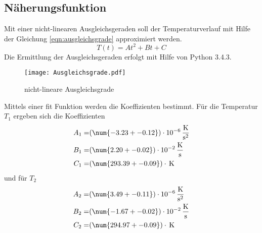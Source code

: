\subsection{Näherungsfunktion}
Mit einer nicht-linearen Ausgleichsgeraden soll der Temperaturverlauf mit Hilfe der Gleichung \ref{eqn:ausgleichsgrade} approximiert werden.
\begin{equation}
  T(t) = At^2 + Bt +C
  \label{eqn:ausgleichsgrade}
\end{equation}
Die Ermittlung der Ausgleichsgeraden erfolgt mit Hilfe von Python 3.4.3.
\begin{figure}
  \centering
  \texttt{[image: Ausgleichsgrade.pdf]}
  \caption{nicht-lineare Ausgleichsgrade}
  \label{fig:ausg}
\end{figure}
Mittels einer fit Funktion werden die Koeffizienten bestimmt. Für die Temperatur $T_\text{1}$ ergeben sich die Koeffizienten
\begin{eqnarray*}
  A_1 =& (\num{-3.23 +- 0.12}) \cdot 10^{-6} \, \frac{\text{K}}{\text{s}^2}	\\
  B_1 =& (\num{2.20 +- 0.02}) \cdot 10^{-2} \, \frac{\text{K}}{\text{s}} 	\\
C_1 =& (\num{293.39 +- 0.09})  \cdot \, \text{K}
  \label{eqn:koefT1}
\end{eqnarray*}
und für $T_\text{2}$
\begin{eqnarray*}
  A_2 =& (\num{3.49 +- 0.11}) \cdot 10^{-6} \, \frac{\text{K}}{\text{s}^2} 	\\
  B_2 =& (\num{-1.67 +- 0.02}) \cdot 10^{-2} \, \frac{\text{K}}{\text{s}} 	\\
  C_2 =& (\num{294.97 +- 0.09}) \cdot \, \text{K}
  \label{eqn:koefT2}
\end{eqnarray*}

